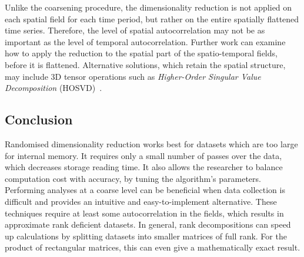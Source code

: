 \documentclass[ijgi,article,submit,moreauthors,pdftex,10pt,a4paper]{Definitions/mdpi}
\begin{document}
Unlike the coarsening procedure, the dimensionality reduction is not applied on each spatial field for each time period, but rather on the entire spatially flattened time series. Therefore, the level of spatial autocorrelation may not be as important as the level of temporal autocorrelation. Further work can examine how to apply the reduction to the spatial part of the spatio-temporal fields, before it is flattened. Alternative solutions, which retain the spatial structure, may include 3D tensor operations such as \textit{Higher-Order Singular Value Decomposition} (HOSVD)~\cite{Tucker1964}.

\subsection{Conclusion}
\label{sec:Discussion/Summary} %

Randomised dimensionality reduction works best for datasets which are too large for internal memory. It requires only a small number of passes over the data, which decreases storage reading time. It also allows the researcher to balance computation cost with accuracy, by tuning the algorithm's parameters. Performing analyses at a coarse level can be beneficial when data collection is difficult and provides an intuitive and easy-to-implement alternative. These techniques require at least some autocorrelation in the fields, which results in approximate rank deficient datasets. In general, rank decompositions can speed up calculations by splitting datasets into smaller matrices of full rank. For the product of rectangular matrices, this can even give a mathematically exact result.
\\ %



\end{document}
